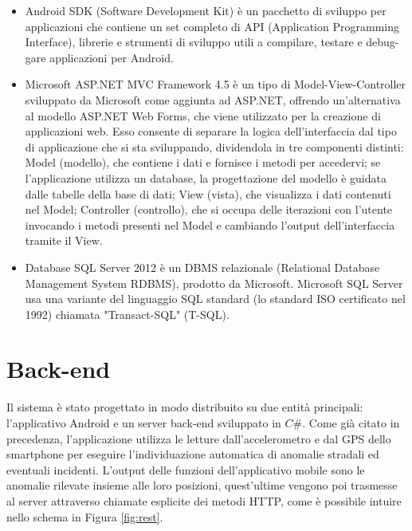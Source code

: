 \documentclass[a4paper, 11pt]{article} %
\begin{document}
\begin{itemize}
	\item Android SDK (Software Development Kit) è un pacchetto di sviluppo per applicazioni che contiene un set completo di API (Application Programming Interface), librerie e strumenti di sviluppo utili a compilare, testare e debug-gare applicazioni per Android.
	
	\item Microsoft ASP.NET MVC Framework 4.5  è un tipo di Model-View-Controller sviluppato da Microsoft come aggiunta ad ASP.NET, offrendo un'alternativa al modello ASP.NET Web Forms, che viene utilizzato per la creazione di applicazioni web. Esso consente di separare la logica dell’interfaccia dal tipo di applicazione che si sta sviluppando, dividendola in tre componenti distinti: Model (modello), che contiene i dati e fornisce i metodi per accedervi; se l’applicazione utilizza un database, la progettazione del modello è guidata dalle tabelle della base di dati; View (vista), che visualizza i dati contenuti nel Model; Controller (controllo), che si occupa delle iterazioni con l’utente invocando i metodi presenti nel Model e cambiando l’output dell’interfaccia tramite il View.
	
	\item Database SQL Server 2012 è un DBMS relazionale (Relational Database Management System RDBMS), prodotto da Microsoft. Microsoft SQL Server usa una variante del linguaggio SQL standard (lo standard ISO certificato nel 1992) chiamata "Transact-SQL" (T-SQL).
\end{itemize}

\section{Back-end}
Il sistema è stato progettato in modo distribuito su due entità principali: l'applicativo Android e un server back-end sviluppato in $C\#$. Come già citato in precedenza, l'applicazione utilizza le letture dall'accelerometro e dal GPS dello smartphone per eseguire l'individuazione automatica di anomalie stradali ed eventuali incidenti. L'output delle funzioni dell'applicativo mobile sono le anomalie rilevate insieme alle loro posizioni, quest'ultime vengono poi trasmesse al server attraverso chiamate esplicite dei metodi HTTP, come è possibile intuire nello schema in Figura \ref{fig:rest}.
\end{document}
